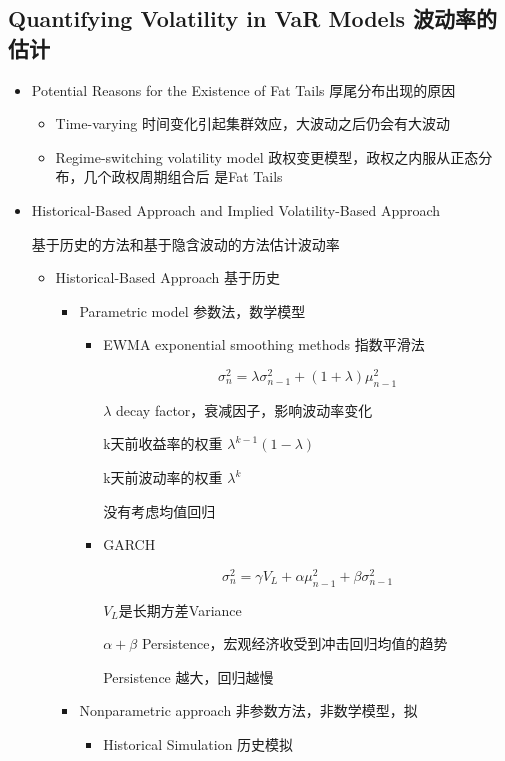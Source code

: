 \documentclass[a4paper,6pt,twoside,openany]{article}
\begin{document}
\subsection{Quantifying Volatility in VaR Models 波动率的估计}
\begin{itemize}
\item Potential Reasons for the Existence of Fat Tails 厚尾分布出现的原因
  \begin{itemize}
  \item Time-varying 时间变化引起集群效应，大波动之后仍会有大波动
  \item Regime-switching volatility model 政权变更模型，政权之内服从正态分布，几个政权周期组合后
    是Fat Tails
  \end{itemize}
\item Historical-Based Approach and Implied Volatility-Based Approach
  \par 基于历史的方法和基于隐含波动的方法估计波动率
  \begin{itemize}
  \item Historical-Based Approach 基于历史
    \begin{itemize}
    \item Parametric model 参数法，数学模型
      \begin{itemize}
      \item EWMA exponential smoothing methods 指数平滑法
        \par $$\sigma_n^2 = \lambda \sigma_{n-1}^2 + (1 + \lambda)\mu_{n-1}^2$$
        \par $\lambda$ decay factor，衰减因子，影响波动率变化
        \par k天前收益率的权重 $\lambda^{k-1}(1 - \lambda)$
        \par k天前波动率的权重 $\lambda^k$
        \par 没有考虑均值回归
      \item GARCH
        \par $$\sigma_n^2 = \gamma V_L + \alpha \mu_{n-1}^2 + \beta \sigma_{n-1}^2  $$
        \par $V_L$是长期方差Variance
        \par $\alpha + \beta$ Persistence，宏观经济收受到冲击回归均值的趋势
        \par Persistence 越大，回归越慢
      \end{itemize}
    \item Nonparametric approach 非参数方法，非数学模型，拟
      \begin{itemize}
      \item Historical Simulation 历史模拟

\end{itemize}
\end{itemize}
\end{itemize}
\end{itemize}
\end{document}

